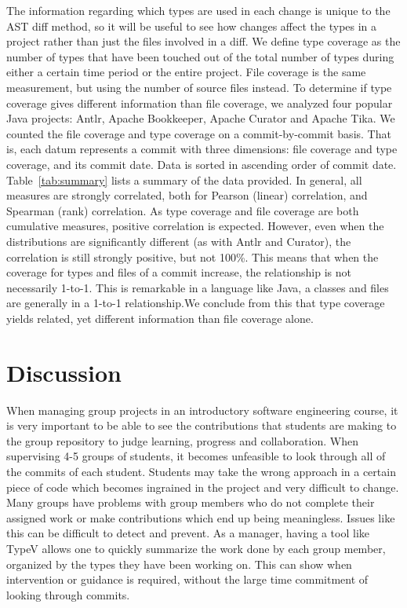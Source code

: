 \documentclass[conference]{IEEEtran}
\begin{document}
The information regarding which types are used in each change is unique to the AST diff method, so it will be useful to see how changes affect the types in a project rather than just the files involved in a diff. We define type coverage as the number of types that have been touched out of the total number of types during either a certain time period or the entire project. File coverage is the same measurement, but using the number of source files instead. To determine if type coverage gives different information than file coverage, we analyzed four popular Java projects: Antlr, Apache Bookkeeper, Apache Curator and Apache Tika. We counted the file coverage and type coverage on a commit-by-commit basis. That is, each datum represents a commit with three dimensions: file coverage and type coverage, and its commit date. Data is sorted in ascending order of commit date. Table~\ref{tab:summary} lists a summary of the data provided. In general, all measures are strongly correlated, both for Pearson (linear) correlation, and Spearman (rank) correlation. As type coverage and file coverage are both cumulative measures, positive correlation is expected. However, even when the distributions are significantly different (as with Antlr and Curator), the correlation is still strongly positive, but not 100\%. This means that when the coverage for types and files of a commit increase, the relationship is not necessarily 1-to-1. This is remarkable in a language like Java, a classes and files are generally in a 1-to-1 relationship.We conclude from this that type coverage yields related, yet different information than file coverage alone.

\section{Discussion}

When managing group projects in an introductory software engineering course, it is very important to be able to see the contributions that students are making to the group repository to judge learning, progress and collaboration. When supervising 4-5 groups of students, it becomes unfeasible to look through all of the commits of each student. Students may take the wrong approach in a certain piece of code which becomes ingrained in the project and very difficult to change. Many groups have problems with group members who do not complete their assigned work or make contributions which end up being meaningless. Issues like this can be difficult to detect and prevent. As a manager, having a tool like TypeV allows one to quickly summarize the work done by each group member, organized by the types they have been working on. This can show when intervention or guidance is required, without the large time commitment of looking through commits.
\end{document}
